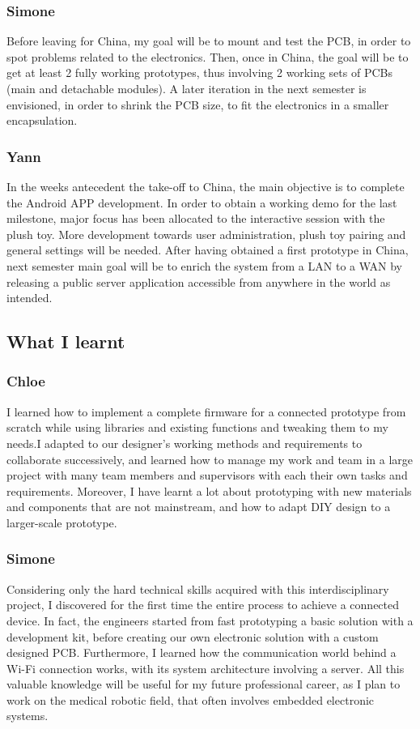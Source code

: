 \subsubsection{Simone}
Before leaving for China, my goal will be to mount and test the PCB, in order to spot problems related to the electronics. Then, once in China, the goal will be to get at least 2 fully working prototypes, thus involving 2 working sets of PCBs (main and detachable modules). A later iteration in the next semester is envisioned, in order to shrink the PCB size, to fit the electronics in a smaller encapsulation.
    
\subsubsection{Yann}
In the weeks antecedent the take-off to China, the main objective is to complete the Android APP development. In order to obtain a working demo for the last milestone, major focus has been allocated to the interactive session with the plush toy. More development towards user administration, plush toy pairing and general settings will be needed. After having obtained a first prototype in China, next semester main goal will be to enrich the system from a LAN to a WAN by releasing a public server application accessible from anywhere in the world as intended.
 
\subsection{What I learnt}
    \subsubsection{Chloe} 
I learned how to implement a complete firmware for a connected prototype from scratch while using libraries and existing functions and tweaking them to my needs.I adapted to our designer's working methods and requirements to collaborate successively, and learned how to manage my work and team in a large project with many team members and supervisors with each their own tasks and requirements. 
Moreover, I have learnt a lot about prototyping with new materials and components that are not mainstream, and how to adapt DIY design to a larger-scale prototype.

\subsubsection{Simone}
Considering only the hard technical skills acquired with this interdisciplinary project, I discovered for the first time the entire process to achieve a connected device. In fact, the engineers started from fast prototyping a basic solution with a development kit, before creating our own electronic solution with a custom designed PCB. Furthermore, I learned how the communication world behind a Wi-Fi connection works, with its system architecture involving a server. All this valuable knowledge will be useful for my future professional career, as I plan to work on the medical robotic field, that often involves embedded electronic systems.
    
